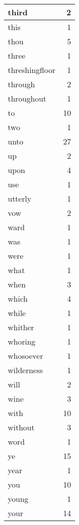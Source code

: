 \begin{center}
\begin{longtable}{l|r}
third & 2 \\ \hline
this & 1 \\ \hline
thou & 5 \\ \hline
three & 1 \\ \hline
threshingfloor & 1 \\ \hline
through & 2 \\ \hline
throughout & 1 \\ \hline
to & 10 \\ \hline
two & 1 \\ \hline
unto & 27 \\ \hline
up & 2 \\ \hline
upon & 4 \\ \hline
use & 1 \\ \hline
utterly & 1 \\ \hline
vow & 2 \\ \hline
ward & 1 \\ \hline
was & 1 \\ \hline
were & 1 \\ \hline
what & 1 \\ \hline
when & 3 \\ \hline
which & 4 \\ \hline
while & 1 \\ \hline
whither & 1 \\ \hline
whoring & 1 \\ \hline
whosoever & 1 \\ \hline
wilderness & 1 \\ \hline
will & 2 \\ \hline
wine & 3 \\ \hline
with & 10 \\ \hline
without & 3 \\ \hline
word & 1 \\ \hline
ye & 15 \\ \hline
year & 1 \\ \hline
you & 10 \\ \hline
young & 1 \\ \hline
your & 14 \\ \hline
\end{longtable}
\end{center}



\normalsize



